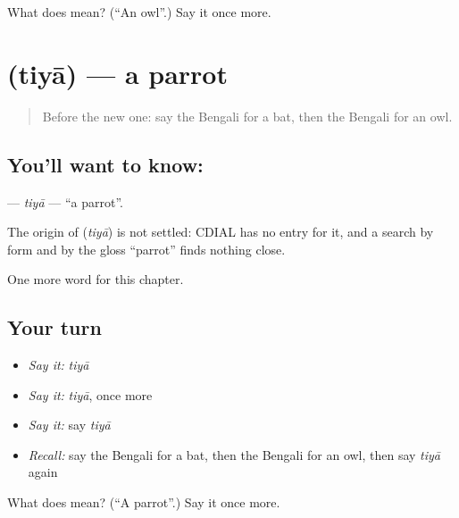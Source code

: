 \begin{tcolorbox}[breakable,colback=teal!4,colframe=teal!35!black,title={Before you move on}]
What does  mean? (\textquotedblleft{}An owl\textquotedblright{}.) Say it once more.
\end{tcolorbox}
\section[\texorpdfstring{\bn{টিয়া} (tiyā)}{টিয়া (tiyā)}]{ (tiyā) — a parrot}

\label{lesson:BN-C121-tiya}



\begin{quote}
Before the new one: say the Bengali for a bat, then the Bengali for an owl.
\end{quote}

\subsection*{You'll want to know: }
\textbf{} — \emph{tiyā} — \textquotedblleft{}a parrot\textquotedblright{}.

\begin{cousinweb}
The origin of \textbf{} (\emph{tiyā}) is not settled: CDIAL has no entry for it, and a search by form and by the gloss \textquotedblleft{}parrot\textquotedblright{} finds nothing close.
\end{cousinweb}

\begin{grammarlens}[title={What you've built}]
One more word for this chapter.
\end{grammarlens}

\subsection*{Your turn}
\begin{itemize}
\raggedright
  \item \emph{Say it:} \emph{tiyā}
  \item \emph{Say it:} \emph{tiyā}, once more
  \item \emph{Say it:} say \emph{tiyā}
  \item \emph{Recall:} say the Bengali for a bat, then the Bengali for an owl, then say \emph{tiyā} again
\end{itemize}

\begin{tcolorbox}[breakable,colback=teal!4,colframe=teal!35!black,title={Before you move on}]
What does  mean? (\textquotedblleft{}A parrot\textquotedblright{}.) Say it once more.
\end{tcolorbox}
